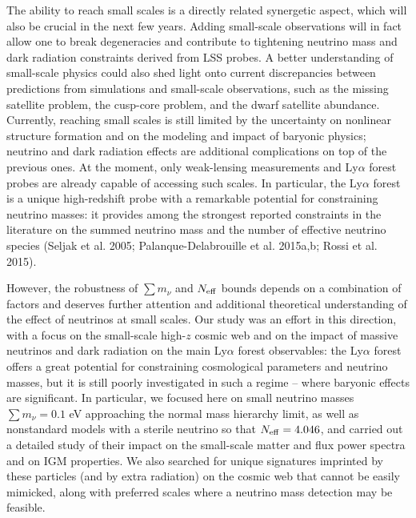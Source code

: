 \documentclass{emulateapj}
\begin{document}
The  ability to  reach small scales is a directly related synergetic aspect, which will also be crucial in the next few years.
Adding small-scale observations will in fact allow one to break degeneracies and contribute to tightening
neutrino mass and dark radiation constraints derived from LSS probes. 
A better understanding of small-scale physics could also shed light onto current discrepancies between predictions from simulations and small-scale observations, such as 
the missing satellite problem, the cusp-core problem, and the dwarf satellite abundance.
Currently, reaching small scales is still limited by the uncertainty on nonlinear structure formation and on the modeling and impact of baryonic physics;
neutrino and dark radiation effects are additional complications on top of the previous ones. 
At the moment, only weak-lensing measurements and 
Ly$\alpha$ forest probes are already 
capable of accessing such scales. 
In particular, the Ly$\alpha$ forest  is a unique high-redshift probe with a 
remarkable potential for constraining neutrino masses: 
it provides among the strongest reported constraints in the literature on the summed neutrino mass and the number of effective neutrino species
(Seljak et al. 2005; Palanque-Delabrouille et al. 2015a,b; Rossi et al. 2015). 
  
However, the robustness of $\sum m_{\nu}$ and $N_{\rm eff}$ 
bounds depends on a combination of factors and
deserves further attention  and additional theoretical understanding of the effect of  neutrinos at small scales. 
Our study was an effort in this direction,  
with a focus on the small-scale 
high-$z$ cosmic web and on the impact of massive neutrinos and dark radiation on the main Ly$\alpha$ forest observables: 
the Ly$\alpha$ forest offers a great potential for constraining  cosmological parameters and neutrino masses, 
but it is still poorly investigated in such a regime -- where baryonic effects are significant. 
In particular, we focused here on small neutrino masses $\sum m_{\nu}=0.1$ eV 
approaching the normal mass hierarchy limit, 
as well as nonstandard models with a sterile neutrino so that $N_{\rm eff}=4.046$,
and carried out a 
detailed study of their impact on the small-scale matter and flux power spectra and on IGM properties.
We also searched for unique signatures imprinted by these particles (and by extra radiation) on the cosmic web
that cannot be easily mimicked, along with preferred scales where a neutrino mass detection may be feasible.
\end{document}
